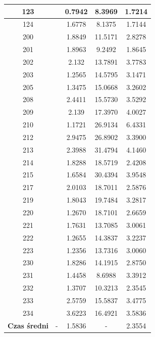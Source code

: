 \begin{table}[!tp]
\begin{tabular}{|c|c|c|c|c|}
		123 & & 0.7942 &  8.3969 & 1.7214\\ \hline
		124 & & 1.6778 &  8.1375 & 1.7144\\ \hline
		200 & & 1.8849 & 11.5171 & 2.8278\\ \hline
		201 & & 1.8963 &  9.2492 & 1.8645\\ \hline
		202 & & 2.132  & 13.7891 & 3.7783\\ \hline
		203 & & 1.2565 & 14.5795 & 3.1471\\ \hline
		205 & & 1.3475 & 15.0668 & 3.2602\\ \hline
		208 & & 2.4411 & 15.5730 & 3.5292\\ \hline
		209 & & 2.139  & 17.3970 & 4.0027\\ \hline	
		210 & & 1.1721 & 26.9134 & 6.4331\\ \hline
		212 & & 2.9475 & 26.8902 & 3.3900\\ \hline
		213 & & 2.3988 & 31.4794 & 4.1460\\ \hline
		214 & & 1.8288 & 18.5719 & 2.4208\\ \hline
		215 & & 1.6584 & 30.4394 & 3.9548\\ \hline
		217 & & 2.0103 & 18.7011 & 2.5876\\ \hline
		219 & & 1.8043 & 19.7484 & 3.2817\\ \hline
		220 & & 1.2670 & 18.7101 & 2.6659\\ \hline		
		221 & & 1.7631 & 13.7085 & 3.0061\\ \hline
		222 & & 1.2655 & 14.3837 & 3.2237\\ \hline
		223 & & 1.2356 & 13.7316 & 3.0060\\ \hline
		230 & & 1.8286 & 14.1915 & 2.8750\\ \hline
		231 & & 1.4458 &  8.6988 & 3.3912\\ \hline
		232 & & 1.3707 & 10.3213 & 2.3545\\ \hline
		233 & & 2.5759 & 15.5837 & 3.4775\\ \hline
		234 & & 3.6223 & 16.4921 & 3.5836\\ \hline
		\textbf{Czas średni} & - & 1.5836 & - & 2.3554\\ \hline
	\end{tabular}
\end{table}

